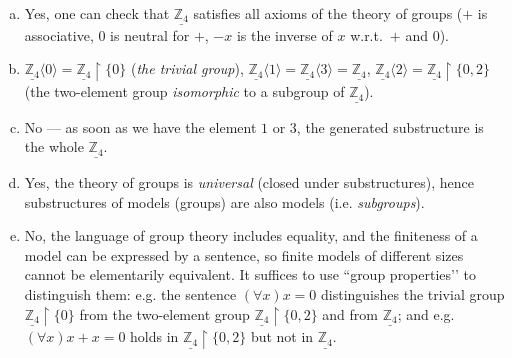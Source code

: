 \begin{problem}
\begin{solution}
        \begin{enumerate}[(a)]
            \item Yes, one can check that $\underline{\mathbb Z_4}$ satisfies all axioms of the theory of groups ($+$ is associative, $0$ is neutral for $+$, $-x$ is the inverse of $x$ w.r.t.\ $+$ and $0$).
            \item $\underline{\mathbb Z_4}\langle 0\rangle=\underline{\mathbb Z_4}\restriction\{0\}$ (\emph{the trivial group}), $\underline{\mathbb Z_4}\langle 1\rangle=\underline{\mathbb Z_4}\langle 3\rangle=\underline{\mathbb Z_4}$, $\underline{\mathbb Z_4}\langle 2\rangle=\underline{\mathbb Z_4}\restriction\{0,2\}$ (the two-element group \emph{isomorphic} to a subgroup of $\underline{\mathbb Z_4}$).
            \item No — as soon as we have the element $1$ or $3$, the generated substructure is the whole $\underline{\mathbb Z_4}$.
            \item Yes, the theory of groups is \emph{universal} (closed under substructures), hence substructures of models (groups) are also models (i.e. \emph{subgroups}).
            \item No, the language of group theory includes equality, and the finiteness of a model can be expressed by a sentence, so finite models of different sizes cannot be elementarily equivalent. It suffices to use “group properties’’ to distinguish them: e.g. the sentence $(\forall x)x=0$ distinguishes the trivial group $\underline{\mathbb Z_4}\restriction\{0\}$ from the two-element group $\underline{\mathbb Z_4}\restriction\{0,2\}$ and from $\underline{\mathbb Z_4}$; and e.g. $(\forall x)x+x=0$ holds in $\underline{\mathbb Z_4}\restriction\{0,2\}$ but not in $\underline{\mathbb Z_4}$.
        \end{enumerate}
                    
    \end{solution}

\end{problem}


